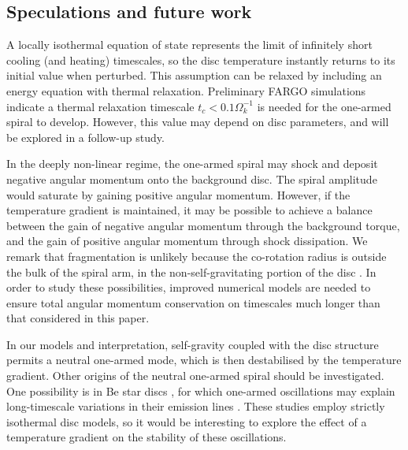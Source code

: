 \subsection{Speculations and future work}
A locally isothermal equation of state represents the limit of
infinitely short cooling (and heating) timescales, so the disc
temperature instantly returns to its initial value when perturbed.  
This assumption can be relaxed by including an energy equation with
thermal relaxation. Preliminary FARGO simulations
indicate a thermal relaxation timescale $t_c < 0.1\Omega_k^{-1}$ is
needed for the one-armed spiral to develop. However, this value may
depend on disc parameters, and will be explored in a follow-up  
study.  

In the deeply non-linear regime, the one-armed spiral may 
shock and deposit negative angular momentum onto
the background disc. The spiral amplitude would saturate by gaining
positive angular momentum. However, if the temperature gradient is
maintained, it may be possible to achieve a balance between the gain
of negative angular momentum through the background torque, and the
gain of positive angular momentum through shock dissipation. We remark  
that fragmentation is unlikely because the co-rotation radius 
is outside the bulk of the spiral arm, in the non-self-gravitating
portion of the disc \citep{durisen08}. In order
to study these possibilities, improved numerical models are needed to
ensure total angular momentum conservation on timescales much longer
than that considered in this paper. 


In our models and interpretation, self-gravity coupled with the disc 
structure permits a neutral one-armed mode, which is then
destabilised by the temperature gradient. Other origins of the neutral
one-armed spiral should be investigated. One possibility is in Be star discs
\citep{rivinius13}, for which 
one-armed oscillations may explain long-timescale variations in their
emission lines \citep[see e.g.][and references
therein]{okasaki97,papaloizou06c,ogilvie08}. These studies employ
strictly isothermal disc models, so it would be interesting to explore
the effect of a temperature gradient on the stability of these
oscillations. 



